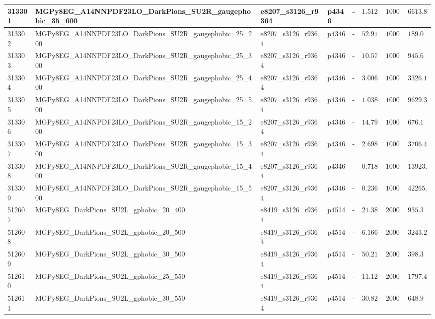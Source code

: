 \begin{table}[!hbtp]
{\begin{tabular}{llllllll}
    \hline
    313301 & MGPy8EG\_A14NNPDF23LO\_DarkPions\_SU2R\_gaugephobic\_35\_600 & e8207\_s3126\_r9364 & p4346 & - & $1.512$ & $10000$ & $6613.8$\\
    \hline
    313302 & MGPy8EG\_A14NNPDF23LO\_DarkPions\_SU2R\_gaugephobic\_25\_200 & e8207\_s3126\_r9364 & p4346 & - & $52.91$ & $10000$ & $189.0$\\
    \hline
    313303 & MGPy8EG\_A14NNPDF23LO\_DarkPions\_SU2R\_gaugephobic\_25\_300 & e8207\_s3126\_r9364 & p4346 & - & $10.575$ & $10000$ & $945.6$\\
    \hline
    313304 & MGPy8EG\_A14NNPDF23LO\_DarkPions\_SU2R\_gaugephobic\_25\_400 & e8207\_s3126\_r9364 & p4346 & - & $3.0065$ & $10000$ & $3326.1$\\
    \hline
    313305 & MGPy8EG\_A14NNPDF23LO\_DarkPions\_SU2R\_gaugephobic\_25\_500 & e8207\_s3126\_r9364 & p4346 & - & $1.0385$ & $10000$ & $9629.3$\\
    \hline
    313306 & MGPy8EG\_A14NNPDF23LO\_DarkPions\_SU2R\_gaugephobic\_15\_200 & e8207\_s3126\_r9364 & p4346 & - & $14.79$ & $10000$ & $676.1$\\
    \hline
    313307 & MGPy8EG\_A14NNPDF23LO\_DarkPions\_SU2R\_gaugephobic\_15\_300 & e8207\_s3126\_r9364 & p4346 & - & $2.698$ & $10000$ & $3706.4$\\
    \hline
    313308 & MGPy8EG\_A14NNPDF23LO\_DarkPions\_SU2R\_gaugephobic\_15\_400 & e8207\_s3126\_r9364 & p4346 & - & $0.7182$ & $10000$ & $13923.7$\\
    \hline
    313309 & MGPy8EG\_A14NNPDF23LO\_DarkPions\_SU2R\_gaugephobic\_15\_500 & e8207\_s3126\_r9364 & p4346 & - & $0.2366$ & $10000$ & $42265.4$\\
    \hline
    512607 & MGPy8EG\_DarkPions\_SU2L\_gphobic\_20\_400 & e8419\_s3126\_r9364 & p4514 & - & $21.383$ & $20000$ & $935.3$\\
    \hline
    512608 & MGPy8EG\_DarkPions\_SU2L\_gphobic\_20\_500 & e8419\_s3126\_r9364 & p4514 & - & $6.1667$ & $20000$ & $3243.2$\\
    \hline
    512609 & MGPy8EG\_DarkPions\_SU2L\_gphobic\_30\_500 & e8419\_s3126\_r9364 & p4514 & - & $50.212$ & $20000$ & $398.3$\\
    \hline
    512610 & MGPy8EG\_DarkPions\_SU2L\_gphobic\_25\_550 & e8419\_s3126\_r9364 & p4514 & - & $11.127$ & $20000$ & $1797.4$\\
    \hline
    512611 & MGPy8EG\_DarkPions\_SU2L\_gphobic\_30\_550 & e8419\_s3126\_r9364 & p4514 & - & $30.82$ & $20000$ & $648.9$\\

\end{tabular}}
\end{table}
